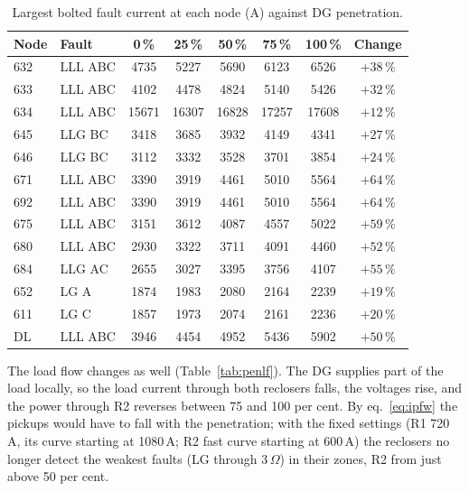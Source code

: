 \documentclass[12pt,a4paper]{article}
\newcommand{\ohm}{\,\ensuremath{\Omega}}
\begin{document}
\begin{table}[H]
\centering\footnotesize
\begin{tabular}{|l|l|c|c|c|c|c|c|}
\hline
\textbf{Node} & \textbf{Fault} & \textbf{0\,\%} & \textbf{25\,\%} & \textbf{50\,\%} & \textbf{75\,\%} & \textbf{100\,\%} & \textbf{Change} \\ \hline
632 & LLL ABC & 4735 & 5227 & 5690 & 6123 & 6526 & $+38\,\%$ \\ \hline
633 & LLL ABC & 4102 & 4478 & 4824 & 5140 & 5426 & $+32\,\%$ \\ \hline
634 & LLL ABC & 15671 & 16307 & 16828 & 17257 & 17608 & $+12\,\%$ \\ \hline
645 & LLG BC & 3418 & 3685 & 3932 & 4149 & 4341 & $+27\,\%$ \\ \hline
646 & LLG BC & 3112 & 3332 & 3528 & 3701 & 3854 & $+24\,\%$ \\ \hline
671 & LLL ABC & 3390 & 3919 & 4461 & 5010 & 5564 & $+64\,\%$ \\ \hline
692 & LLL ABC & 3390 & 3919 & 4461 & 5010 & 5564 & $+64\,\%$ \\ \hline
675 & LLL ABC & 3151 & 3612 & 4087 & 4557 & 5022 & $+59\,\%$ \\ \hline
680 & LLL ABC & 2930 & 3322 & 3711 & 4091 & 4460 & $+52\,\%$ \\ \hline
684 & LLG AC & 2655 & 3027 & 3395 & 3756 & 4107 & $+55\,\%$ \\ \hline
652 & LG A & 1874 & 1983 & 2080 & 2164 & 2239 & $+19\,\%$ \\ \hline
611 & LG C & 1857 & 1973 & 2074 & 2161 & 2236 & $+20\,\%$ \\ \hline
DL & LLL ABC & 3946 & 4454 & 4952 & 5436 & 5902 & $+50\,\%$ \\ \hline
\end{tabular}
\caption{Largest bolted fault current at each node (A) against DG penetration.}
\label{tab:pensc}
\end{table}

The load flow changes as well (Table~\ref{tab:penlf}). The DG supplies part of the load locally, so the load
current through both reclosers falls, the voltages rise, and the power through R2 reverses between 75 and
100 per cent. By eq.~\eqref{eq:ipfw} the pickups would have to fall with the penetration; with the fixed settings
(R1 720\,A, its curve starting at 1080\,A; R2 fast curve starting at 600\,A) the reclosers no longer detect the
weakest faults (LG through 3\ohm) in their zones, R2 from just above 50 per cent.
\end{document}
